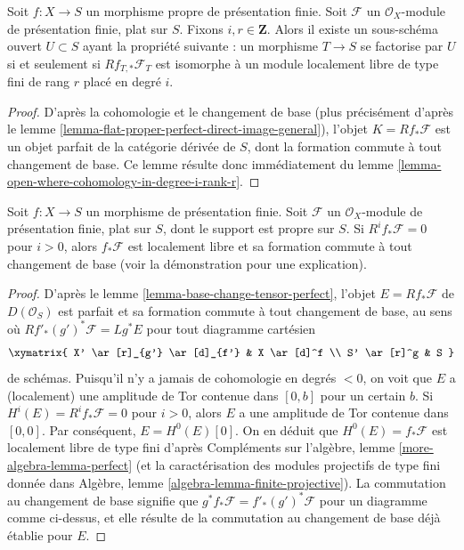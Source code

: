 \begin{lemma}
\label{lemma-open-where-cohomology-in-degree-i-rank-r-geometric}
Soit $f : X \to S$ un morphisme propre de présentation finie.
Soit $\mathcal{F}$ un $\mathcal{O}_X$-module de présentation finie,
plat sur $S$. Fixons $i, r \in \mathbf{Z}$.
Alors il existe un sous-schéma ouvert
$U \subset S$ ayant la propriété suivante :
un morphisme $T \to S$ se factorise par $U$ si et seulement si
$Rf_{T, *}\mathcal{F}_T$ est isomorphe à un
module localement libre de type fini de rang $r$ placé en degré $i$.
\end{lemma}

\begin{proof}
D'après la cohomologie et le changement de base (plus précisément d'après le
lemme \ref{lemma-flat-proper-perfect-direct-image-general}),
l'objet $K = Rf_*\mathcal{F}$ est un objet parfait de la catégorie dérivée
de $S$, dont la formation commute à tout changement de base.
Ce lemme résulte donc immédiatement du
lemme \ref{lemma-open-where-cohomology-in-degree-i-rank-r}.
\end{proof}

\begin{lemma}
\label{lemma-vanishing-implies-locally-free}
Soit $f : X \to S$ un morphisme de présentation finie.
Soit $\mathcal{F}$ un $\mathcal{O}_X$-module de présentation finie,
plat sur $S$, dont le support est propre sur $S$. Si $R^if_*\mathcal{F} = 0$
pour $i > 0$, alors $f_*\mathcal{F}$ est localement libre et sa formation
commute à tout changement de base (voir la démonstration pour une explication).
\end{lemma}

\begin{proof}
D'après le lemme \ref{lemma-base-change-tensor-perfect},
l'objet $E = Rf_*\mathcal{F}$ de $D(\mathcal{O}_S)$
est parfait et sa formation commute à tout changement de base,
au sens où $Rf'_*(g')^*\mathcal{F} = Lg^*E$
pour tout diagramme cartésien
$$
\xymatrix{
X' \ar[r]_{g'} \ar[d]_{f'} &
X \ar[d]^f \\
S' \ar[r]^g &
S
}
$$
de schémas.
Puisqu'il n'y a jamais de cohomologie en degrés $< 0$, on voit que
$E$ a (localement) une amplitude de Tor contenue dans $[0, b]$ pour un certain $b$.
Si $H^i(E) = R^if_*\mathcal{F} = 0$ pour $i > 0$,
alors $E$ a une amplitude de Tor contenue dans $[0, 0]$. Par conséquent,
$E = H^0(E)[0]$. On en déduit que $H^0(E) = f_*\mathcal{F}$
est localement libre de type fini d'après
Compléments sur l'algèbre, lemme \ref{more-algebra-lemma-perfect}
(et la caractérisation des modules projectifs de type fini donnée dans
Algèbre, lemme \ref{algebra-lemma-finite-projective}).
La commutation au changement de base signifie que
$g^*f_*\mathcal{F} = f'_*(g')^*\mathcal{F}$ pour
un diagramme comme ci-dessus, et elle résulte de la commutation au changement
de base déjà établie pour $E$.
\end{proof}

